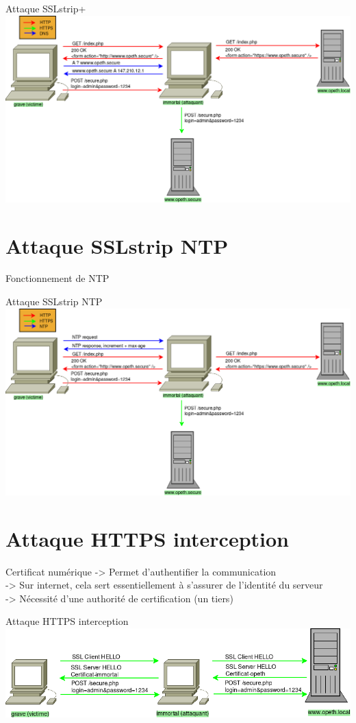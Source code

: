 \documentclass{beamer}
\begin{document}
\begin{frame}{Attaque SSLstrip+}
    \includegraphics[scale=0.32]{../medias/sslstrip2/attack.png}
\end{frame}

\section{Attaque SSLstrip NTP}

\begin{frame}{Fonctionnement de NTP}
\end{frame}

\begin{frame}{Attaque SSLstrip NTP}
    \includegraphics[scale=0.32]{../medias/sslstrip-ntp/attack.png}
\end{frame}

\section{Attaque HTTPS interception}

\begin{frame}{Certificat numérique}
    -> Permet d'authentifier la communication \\
    -> Sur internet, cela sert essentiellement à s'assurer de l'identité du serveur \\
    -> Nécessité d'une authorité de certification (un tiers) \\
\end{frame}

\begin{frame}{Attaque HTTPS interception}
    \includegraphics[scale=0.4]{../medias/https-interception/attack.png}
\end{frame}
\end{document}
